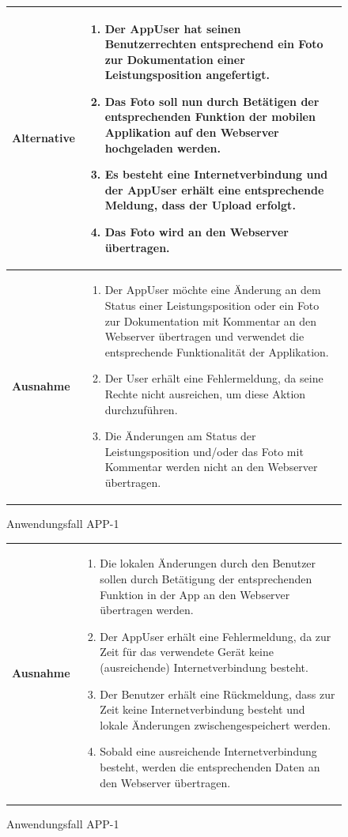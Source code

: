 			\begin{figure}[h]
	\centering
	\begin{tabularx}{\textwidth}{ X | X }
		\textbf{Alternative} & 
				\begin{enumerate}
					 \item Der AppUser hat seinen Benutzerrechten entsprechend ein Foto zur Dokumentation einer Leistungsposition angefertigt.
					 \item Das Foto soll nun durch Bet\"atigen der entsprechenden Funktion der mobilen Applikation auf den Webserver hochgeladen werden.
					 \item Es besteht eine Internetverbindung und der AppUser erh\"alt eine entsprechende Meldung,  dass der Upload erfolgt.
					 \item Das Foto wird an den Webserver \"ubertragen.
				\end{enumerate}  \\ \hline
						\textbf{Ausnahme} &
				\begin{enumerate}
					 \item Der AppUser m\"ochte eine \"Anderung an dem Status einer Leistungsposition oder ein Foto zur Dokumentation mit Kommentar an den Webserver \"ubertragen und verwendet die entsprechende Funktionalit\"at der Applikation.
					 \item Der User erh\"alt eine Fehlermeldung, da seine Rechte nicht ausreichen, um diese Aktion durchzuf\"uhren.
					 \item Die \"Anderungen am Status der Leistungsposition und/oder das Foto mit Kommentar werden nicht an den Webserver \"ubertragen.
					 \end{enumerate} \\ \hline
	\end{tabularx}
	\caption{Anwendungsfall APP-1}
	\label{fig:anwendungsfall-app-tabelle-APP-1-2}
\end{figure}
			\begin{figure}[h]
	\centering
	\begin{tabularx}{\textwidth}{ X | X }
					 	\textbf{Ausnahme} &
				\begin{enumerate}
					\item Die lokalen \"Anderungen durch den Benutzer sollen durch Bet\"atigung der entsprechenden Funktion in der App an den Webserver \"ubertragen werden.
					\item Der AppUser erh\"alt eine Fehlermeldung, da zur Zeit f\"ur das verwendete Ger\"at keine (ausreichende) Internetverbindung besteht. 
					\item Der Benutzer erh\"alt eine R\"uckmeldung, dass zur Zeit keine Internetverbindung besteht und lokale \"Anderungen zwischengespeichert werden.
					\item Sobald eine ausreichende Internetverbindung besteht, werden die entsprechenden Daten an den Webserver \"ubertragen.
				\end{enumerate} 
				 	\end{tabularx}
	\caption{Anwendungsfall APP-1}
	\label{fig:anwendungsfall-app-tabelle-APP-1-3}
\end{figure}
